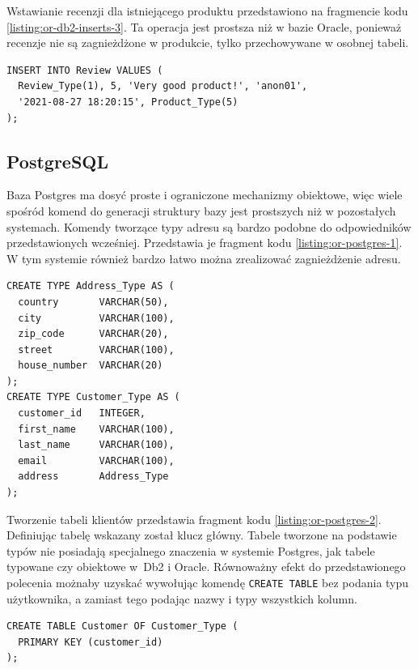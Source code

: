 \documentclass[a4paper,twoside,12pt]{book}
\begin{document}
Wstawianie recenzji dla istniejącego produktu przedstawiono na fragmencie kodu \ref{listing:or-db2-inserts-3}. Ta operacja jest prostsza niż w bazie Oracle, ponieważ recenzje nie są zagnieżdżone w produkcie, tylko przechowywane w osobnej tabeli.

\begin{lstlisting}[style=SQL, caption={Wstawianie recenzji do bazy Db2.}, label={listing:or-db2-inserts-3}, captionpos=b]
INSERT INTO Review VALUES (
  Review_Type(1), 5, 'Very good product!', 'anon01', 
  '2021-08-27 18:20:15', Product_Type(5)
);
\end{lstlisting}

\subsection{PostgreSQL}

Baza Postgres ma dosyć proste i ograniczone mechanizmy obiektowe, więc wiele spośród komend do generacji struktury bazy jest prostszych niż w pozostałych systemach. Komendy tworzące typy adresu są bardzo podobne do odpowiedników przedstawionych wcześniej. Przedstawia je fragment kodu \ref{listing:or-postgres-1}. W tym systemie również bardzo łatwo można zrealizować zagnieżdżenie adresu.

\begin{lstlisting}[style=SQL, caption={Tworzenie typów adresu i klienta w Postgres.}, label={listing:or-postgres-1}, captionpos=b]
CREATE TYPE Address_Type AS (
  country       VARCHAR(50),
  city          VARCHAR(100),
  zip_code      VARCHAR(20),
  street        VARCHAR(100),
  house_number  VARCHAR(20)
);
CREATE TYPE Customer_Type AS (
  customer_id   INTEGER,
  first_name    VARCHAR(100),
  last_name     VARCHAR(100),
  email         VARCHAR(100),
  address       Address_Type
);
\end{lstlisting}

Tworzenie tabeli klientów przedstawia fragment kodu \ref{listing:or-postgres-2}. Definiując tabelę wskazany został klucz główny. Tabele tworzone na podstawie typów nie posiadają specjalnego znaczenia w systemie Postgres, jak tabele typowane czy obiektowe w~Db2 i Oracle. Równoważny efekt do przedstawionego polecenia możnaby uzyskać wywołując komendę \lstinline{CREATE TABLE} bez podania typu użytkownika, a zamiast tego podając nazwy i typy wszystkich kolumn.

\begin{minipage}{\linewidth}
\begin{lstlisting}[style=SQL, caption={Tworzenie tabeli klientów w Postgres.}, label={listing:or-postgres-2}, captionpos=b]
CREATE TABLE Customer OF Customer_Type (
  PRIMARY KEY (customer_id)
);
\end{lstlisting}
\end{minipage}
\end{document}
